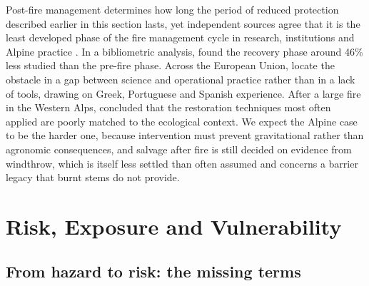 \documentclass[11pt,a4paper]{article}
\begin{document}
Post-fire management determines how long the period of reduced protection described earlier in this section lasts, yet independent sources agree that it is the least developed phase of the fire management cycle in research, institutions and Alpine practice \citep{goncalves_fostering_2025, vieira_postfire_2026, mantero_short-term_2023}. In a bibliometric analysis, \citet{goncalves_fostering_2025} found the recovery phase around 46\% less studied than the pre-fire phase. Across the European Union, \citet{vieira_postfire_2026} locate the obstacle in a gap between science and operational practice rather than in a lack of tools, drawing on Greek, Portuguese and Spanish experience. After a large fire in the Western Alps, \citet{mantero_short-term_2023} concluded that the restoration techniques most often applied are poorly matched to the ecological context. We expect the Alpine case to be the harder one, because intervention must prevent gravitational rather than agronomic consequences, and salvage after fire is still decided on evidence from windthrow, which is itself less settled than often assumed \citep{seben_impact_2024} and concerns a barrier legacy that burnt stems do not provide.

\section{Risk, Exposure and Vulnerability}
\label{sec:risk}

\subsection{From hazard to risk: the missing terms}
\end{document}

